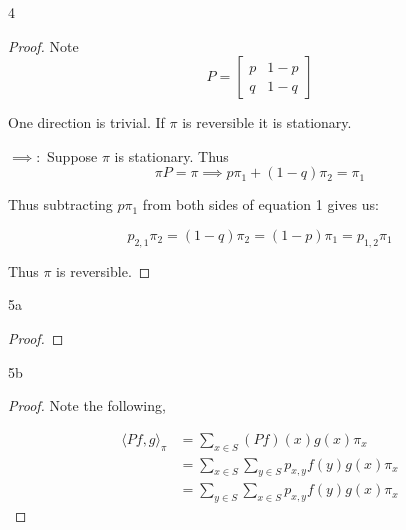 \documentclass{article}
\newcommand{\angles}[1]{\langle #1 \rangle}
\begin{document}
\bigskip

\begin{PROB}{4}\label{Problem 4.}
\end{PROB}
\begin{proof}

    Note \[P = \begin{bmatrix}
        p & 1 - p \\ q & 1 - q
    \end{bmatrix}\]

    One direction is trivial. If $\pi$ is reversible it is stationary. 
    
    $\implies: $ Suppose $\pi$ is stationary. Thus
    \[\pi P = \pi \implies p \pi_1 + (1 - q) \pi_2 = \pi_1\]
    
    Thus subtracting $p \pi_1$ from both sides of equation 1 gives us:   

    \[p_{2, 1} \pi_2 = (1 - q) \pi_2 = (1 - p) \pi_1 = p_{1, 2} \pi_1 \]

    Thus $\pi$ is reversible.  

    
\end{proof}

\bigskip

\begin{PROB}{5a}\label{Problem 5a.}
\end{PROB}
\begin{proof}
    
\end{proof}

\bigskip

\begin{PROB}{5b}\label{Problem 5b.}
\end{PROB}
\begin{proof}

    Note the following,  

    \begin{align*}
        \angles{Pf, g}_{\pi} &= \sum_{x \in S} (Pf)(x) g(x) \pi_x \\
        &= \sum_{x \in S} \sum_{y \in S}  p_{x, y} f(y) g(x) \pi_x \\
        &= \sum_{y \in S} \sum_{x \in S} p_{x, y} f(y) g(x) \pi_x
    \end{align*}
\end{proof}
\end{document}
